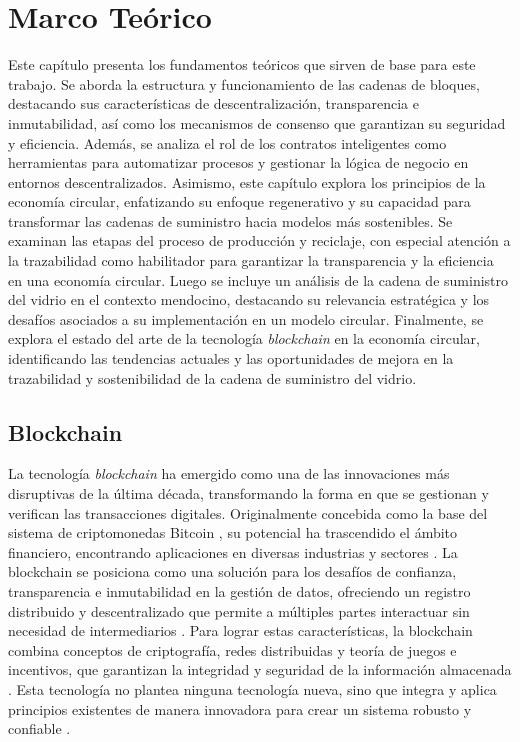 \chapter[Marco Teórico]{Marco Teórico}
\label{cp:theoretical-framework}

\parindent0pt


Este capítulo presenta los fundamentos teóricos que sirven de base para este trabajo. Se aborda la estructura y funcionamiento de las cadenas de bloques, destacando sus características de descentralización, transparencia e inmutabilidad, así como los mecanismos de consenso que garantizan su seguridad y eficiencia. Además, se analiza el rol de los contratos inteligentes como herramientas para automatizar procesos y gestionar la lógica de negocio en entornos descentralizados. Asimismo, este capítulo explora los principios de la economía circular, enfatizando su enfoque regenerativo y su capacidad para transformar las cadenas de suministro hacia modelos más sostenibles. Se examinan las etapas del proceso de producción y reciclaje, con especial atención a la trazabilidad como habilitador para garantizar la transparencia y la eficiencia en una economía circular. Luego se incluye un análisis de la cadena de suministro del vidrio en el contexto mendocino, destacando su relevancia estratégica y los desafíos asociados a su implementación en un modelo circular. Finalmente, se explora el estado del arte de la tecnología \textit{blockchain} en la economía circular, identificando las tendencias actuales y las oportunidades de mejora en la trazabilidad y sostenibilidad de la cadena de suministro del vidrio.

\section{Blockchain}

La tecnología \textit{blockchain} ha emergido como una de las innovaciones más disruptivas de la última década, transformando la forma en que se gestionan y verifican las transacciones digitales. Originalmente concebida como la base del sistema de criptomonedas Bitcoin \cite{satoshi2008bitcoin}, su potencial ha trascendido el ámbito financiero, encontrando aplicaciones en diversas industrias y sectores \cite{bartolomeo2020introduccion}. La blockchain se posiciona como una solución para los desafíos de confianza, transparencia e inmutabilidad en la gestión de datos, ofreciendo un registro distribuido y descentralizado que permite a múltiples partes interactuar sin necesidad de intermediarios \cite{bulkowska2023implementation}. Para lograr estas características, la blockchain combina conceptos de criptografía, redes distribuidas y teoría de juegos e incentivos, que garantizan la integridad y seguridad de la información almacenada \cite{sunny2022systematic}. Esta tecnología no plantea ninguna tecnología nueva, sino que integra y aplica principios existentes de manera innovadora para crear un sistema robusto y confiable \cite{bulkowska2023implementation}.

